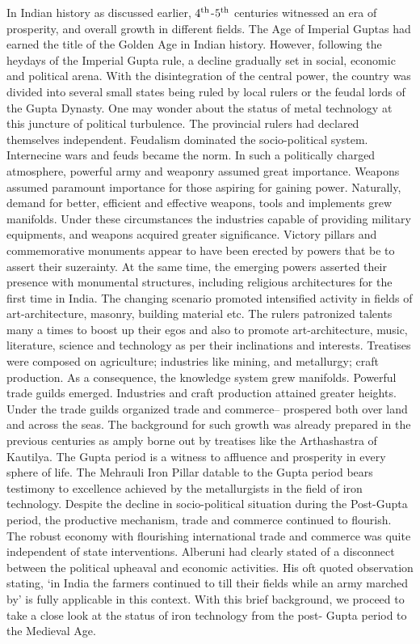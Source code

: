 In Indian history as discussed earlier, $4^{\rm th}$-$5^{\rm th}$ centuries witnessed an era of prosperity, and overall growth in different fields. The Age of Imperial Guptas had earned the title of the Golden Age in Indian history. However, following the heydays of the Imperial Gupta rule, a decline gradually set in social, economic and political arena. With the disintegration of the central power, the country was divided into several small states being ruled by local rulers or the feudal lords of the Gupta Dynasty. One may wonder about the status of metal technology at this juncture of political turbulence. The provincial rulers had declared themselves independent. Feudalism dominated the socio-political system.  Internecine wars and feuds became the norm. In such a politically charged atmosphere, powerful army and weaponry assumed great importance. Weapons assumed paramount importance for those aspiring for gaining power. Naturally, demand for better, efficient and effective weapons, tools and implements grew manifolds. Under these circumstances the industries capable of providing military equipments, and weapons acquired greater significance. Victory pillars and commemorative monuments appear to have been erected by powers that be to assert their suzerainty. At the same time, the emerging powers asserted their presence with monumental structures, including religious architectures for the first time in India. The changing scenario promoted intensified activity in fields of art-architecture, masonry, building material etc. The rulers patronized talents many a times to boost up their egos and also to promote art-architecture, music, literature, science and technology as per their inclinations and interests. Treatises were composed on agriculture; industries like mining, and metallurgy; craft production. As a consequence, the knowledge system grew manifolds. Powerful trade guilds emerged. Industries and craft production attained greater heights. Under the trade guilds organized trade and commerce– prospered both over land and across the seas. The background for such growth was already prepared in the previous centuries as amply borne out by treatises like the Arthashastra of Kautilya. The Gupta period is a witness to affluence and prosperity in every sphere of life. The Mehrauli Iron Pillar datable to the Gupta period bears testimony to excellence achieved by the metallurgists in the field of iron technology.  Despite the decline in socio-political situation during the Post-Gupta period, the productive mechanism, trade and commerce continued to flourish. The robust economy with flourishing international trade and commerce was quite independent of state interventions. Alberuni had clearly stated of a disconnect between the political upheaval and economic activities. His oft quoted observation stating, ‘in India the farmers continued to till their fields while an army marched by’ is fully applicable in this context. With this brief background, we proceed to take a close look at the status of iron technology from the post- Gupta period to the Medieval Age. 

